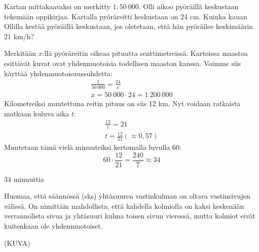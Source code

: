 \begin{esimerkki}
Kartan mittakaavaksi on merkitty $1:50\ 000$. Olli aikoo pyöräillä keskustaan tekemään
oppikirjaa. Kartalla pyöräreitti keskustaan on $24$ cm. Kuinka kauan Ollilla kestää
pyöräillä keskustaan, jos oletetaan, että hän pyöräilee keskimäärin $21$ km/h?
\begin{esimratk}
Merkitään $x$:llä pyöräreitin oikeaa pituutta senttimetreissä.
Kartoissa maastoa esittävät kuvat ovat yhdenmuotoisia todellisen maaston kanssa. Voimme
siis käyttää yhdenmuotoisuussuhdetta:
\begin{align*}
\frac{1}{50\ 000} = \frac{24}{x} \\
x = 50\ 000 \cdot 24 = 1\ 200\ 000
\end{align*}
Kilometreiksi muutettuna reitin pituus on siis 12 km. Nyt voidaan ratkaista matkaan kuluva
aika $t$:
\begin{align*}
\frac{12}{t} = 21 \\
t = \frac{12}{21} (\approx 0,57)
\end{align*}
Muutetaan tämä vielä minuuteiksi kertomalla luvulla 60:
\[
60 \cdot \frac{12}{21} = \frac{240}{7} \approx 34
\]
\end{esimratk}
\begin{esimvast}
34 minuuttia
\end{esimvast}
\end{esimerkki}

Huomaa, että säännössä (sks) yhtäsuuren vastinkulman on oltava vastinsivujen välissä. On
nimittäin mahdollista, että kahdella kolmiolla on kaksi keskenään verrannolista sivua
ja yhtäsuuri kulma toisen sivun vieressä, mutta kolmiot eivät kuitenkaan ole yhdenmuotoiset.

(KUVA)


